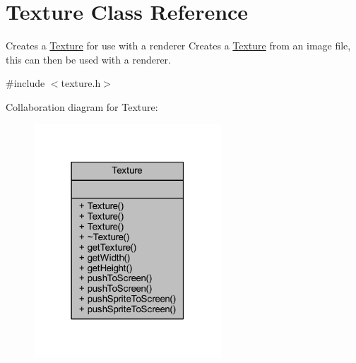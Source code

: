 \hypertarget{class_texture}{\section{Texture Class Reference}
\label{class_texture}
}


Creates a \hyperlink{class_texture}{Texture} for use with a renderer Creates a \hyperlink{class_texture}{Texture} from an image file, this can then be used with a renderer.  




{\ttfamily \#include $<$texture.\+h$>$}



Collaboration diagram for Texture\+:\nopagebreak
\begin{figure}[H]
\begin{center}
\leavevmode
\includegraphics[width=199pt]{class_texture__coll__graph}
\end{center}
\end{figure}

